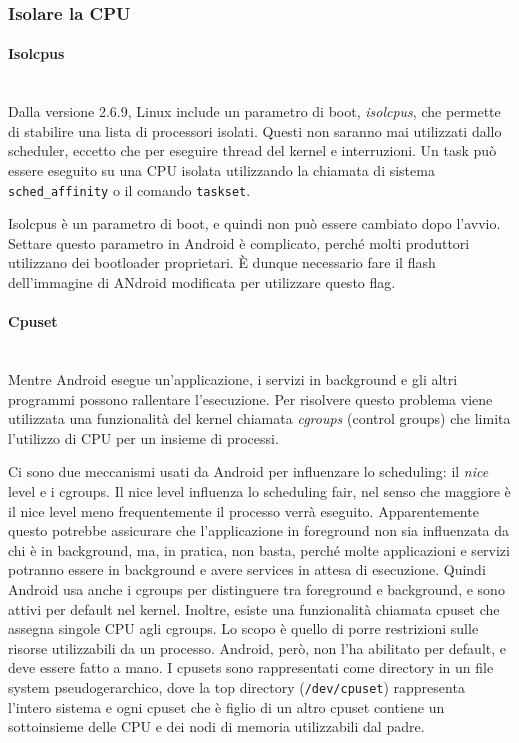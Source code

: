 \subsubsection{Isolare la CPU}

\paragraph{Isolcpus} \mbox{} \\
Dalla versione 2.6.9, Linux include un parametro di boot, \textit{isolcpus}, che permette di stabilire una lista di processori isolati. Questi non saranno mai utilizzati dallo scheduler, eccetto che per eseguire thread del kernel e interruzioni. Un task può essere eseguito su una CPU isolata utilizzando la chiamata di sistema \texttt{sched\_affinity} o il comando \texttt{taskset}.

Isolcpus è un parametro di boot, e quindi non può essere cambiato dopo l'avvio. Settare questo parametro in Android è complicato, perché molti produttori utilizzano dei bootloader proprietari. È dunque necessario fare il flash dell'immagine di ANdroid modificata per utilizzare questo flag.

\paragraph{Cpuset} \mbox{} \\
Mentre Android esegue un'applicazione, i servizi in background e gli altri programmi possono rallentare l'esecuzione. Per risolvere questo problema viene utilizzata una funzionalità del kernel chiamata \textit{cgroups} (control groups) che limita l'utilizzo di CPU per un insieme di processi.

Ci sono due meccanismi usati da Android per influenzare lo scheduling: il \textit{nice} level e i cgroups. Il nice level influenza lo scheduling fair, nel senso che maggiore è il nice level meno frequentemente il processo verrà eseguito. Apparentemente questo potrebbe assicurare che l'applicazione in foreground non sia influenzata da chi è in background, ma, in pratica, non basta, perché molte applicazioni e servizi potranno essere in background e avere services in attesa di esecuzione. Quindi Android usa anche i cgroups per distinguere tra foreground e background, e sono attivi per default nel kernel. Inoltre, esiste una funzionalità chiamata cpuset che assegna singole CPU agli cgroups. Lo scopo è quello di porre restrizioni sulle risorse utilizzabili da un processo. Android, però, non l'ha abilitato per default, e deve essere fatto a mano. I cpusets sono rappresentati come directory in un file system pseudogerarchico, dove la top directory (\texttt{/dev/cpuset}) rappresenta l'intero sistema e ogni cpuset che è figlio di un altro cpuset contiene un sottoinsieme delle CPU e dei nodi di memoria utilizzabili dal padre. 

